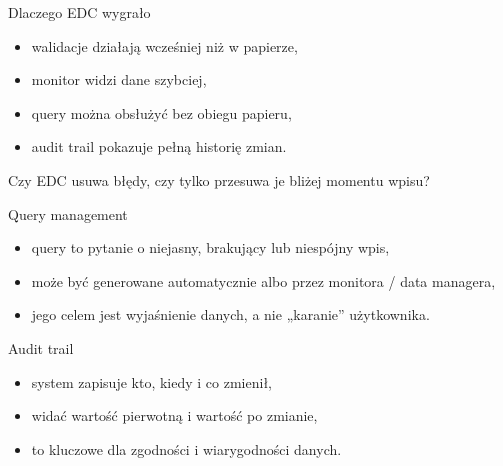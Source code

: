 \begin{frame}{Dlaczego EDC wygrało}
  \begin{itemize}
    \item walidacje działają wcześniej niż w papierze,
    \item monitor widzi dane szybciej,
    \item query można obsłużyć bez obiegu papieru,
    \item audit trail pokazuje pełną historię zmian.
  \end{itemize}

  \vspace{0.3cm}

  \begin{QuestionBox}
    Czy EDC usuwa błędy, czy tylko przesuwa je bliżej momentu wpisu?
  \end{QuestionBox}
\end{frame}

\begin{frame}{Query management}
  \begin{itemize}
    \item query to pytanie o niejasny, brakujący lub niespójny wpis,
    \item może być generowane automatycznie albo przez monitora / data managera,
    \item jego celem jest wyjaśnienie danych, a nie „karanie” użytkownika.
  \end{itemize}
\end{frame}

\begin{frame}{Audit trail}
  \begin{itemize}
    \item system zapisuje kto, kiedy i co zmienił,
    \item widać wartość pierwotną i wartość po zmianie,
    \item to kluczowe dla zgodności i wiarygodności danych.
  \end{itemize}
\end{frame}

